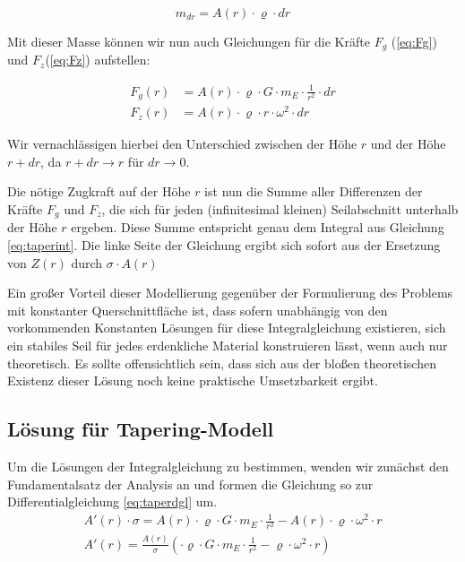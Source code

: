 \documentclass[a4paper, 10pt]{report}
\begin{document}
\begin{equation}
m_{dr} = A(r) \cdot \varrho \cdot dr
\label{eq:samass}
\end{equation}

Mit dieser Masse können wir nun auch Gleichungen für die Kräfte $F_g$ (\ref{eq:Fg}) und $F_z$(\ref{eq:Fz}) aufstellen:

\begin{align}
F_g(r) &= A(r) \cdot \varrho \cdot G \cdot m_E \cdot \frac{1}{r^2} \cdot dr\label{eq:Fg}\\
F_z(r) &= A(r) \cdot \varrho \cdot r \cdot \omega^2 \cdot dr\label{eq:Fz}
\end{align}

Wir vernachlässigen hierbei den Unterschied zwischen der Höhe $r$ und der Höhe $r+dr$, da $r+dr\rightarrow r$ für $dr \rightarrow 0$.

Die nötige Zugkraft auf der Höhe $r$ ist nun die Summe aller Differenzen der Kräfte $F_g$ und $F_z$, die sich für jeden (infinitesimal kleinen) Seilabschnitt unterhalb der Höhe $r$ ergeben. Diese Summe entspricht genau dem Integral aus Gleichung \ref{eq:taperint}. Die linke Seite der Gleichung ergibt sich sofort aus der Ersetzung von $Z(r)$ durch $\sigma \cdot A(r)$

Ein großer Vorteil dieser Modellierung gegenüber der Formulierung des Problems mit konstanter Querschnittfläche ist, dass sofern unabhängig von den vorkommenden Konstanten Lösungen für diese Integralgleichung existieren, sich ein stabiles Seil für jedes erdenkliche Material konstruieren lässt, wenn auch nur theoretisch. Es sollte offensichtlich sein, dass sich aus der bloßen theoretischen Existenz dieser Lösung noch keine praktische Umsetzbarkeit ergibt.

\subsection{Lösung für Tapering-Modell}

Um die Lösungen der Integralgleichung zu bestimmen, wenden wir zunächst den Fundamentalsatz der Analysis an und formen die Gleichung so zur Differentialgleichung \ref{eq:taperdgl} um.
\begin{align}
A'(r) \cdot \sigma = A(r) \cdot \varrho \cdot G \cdot m_E \cdot \frac{1}{r^2} - A(r) \cdot \varrho \cdot \omega^2 \cdot r \nonumber\\
A'(r) = \frac{A(r)}{\sigma} (\cdot \varrho \cdot G \cdot m_E \cdot \frac{1}{r^2} - \varrho \cdot \omega^2 \cdot r)
\label{eq:taperdgl}
\end{align}
\end{document}
